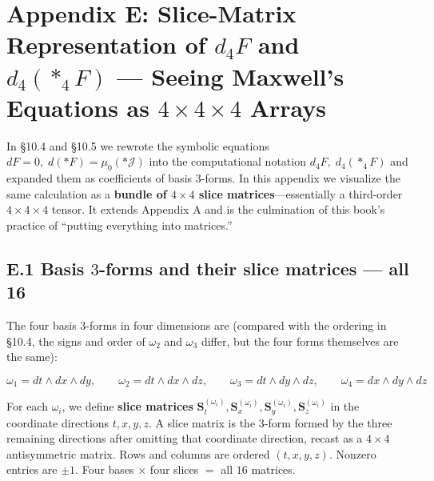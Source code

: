 \documentclass[a4paper,12pt,openany]{book}
\begin{document}
\par\vspace{0.35em}\par

\hypertarget{appendix-e-slice-matrix-representation-of-d_4f-and-d_4ast_4f-seeing-maxwells-equations-as-4times4times4-arrays}{%
\section{\texorpdfstring{Appendix E: Slice-Matrix Representation of
\(d_4F\) and \(d_4(\ast_4F)\) — Seeing Maxwell's Equations as
\(4\times4\times4\)
Arrays}{Appendix E: Slice-Matrix Representation of d\_4F and d\_4(\textbackslash ast\_4F) — Seeing Maxwell's Equations as 4\textbackslash times4\textbackslash times4 Arrays}}\label{appendix-e-slice-matrix-representation-of-d_4f-and-d_4ast_4f-seeing-maxwells-equations-as-4times4times4-arrays}}

In §10.4 and §10.5 we rewrote the symbolic equations
\(dF=0,\;d(\ast F)=\mu_0(\ast\mathcal J)\) into the computational
notation \(d_4F,\;d_4(\ast_4F)\) and expanded them as coefficients of
basis \(3\)-forms. In this appendix we visualize the same calculation as
a \textbf{bundle of $4\times4$ slice matrices}—essentially a
third-order \(4\times4\times4\) tensor. It extends Appendix A and is the
culmination of this book's practice of ``putting everything into
matrices.''

\hypertarget{e.1-basis-3-forms-and-their-slice-matrices-all-16}{%
\subsection*{\texorpdfstring{E.1 Basis \(3\)-forms and their slice
matrices — all
16}{E.1 Basis 3-forms and their slice matrices — all 16}}\label{e.1-basis-3-forms-and-their-slice-matrices-all-16}}

The four basis \(3\)-forms in four dimensions are (compared with the
ordering in §10.4, the signs and order of \(\omega_2\) and \(\omega_3\)
differ, but the four forms themselves are the same):

\[
\omega_1 = dt\wedge dx\wedge dy,\qquad
\omega_2 = dt\wedge dx\wedge dz,\qquad
\omega_3 = dt\wedge dy\wedge dz,\qquad
\omega_4 = dx\wedge dy\wedge dz
\]

For each \(\omega_i\), we define \textbf{slice matrices}
\(\mathbf{S}_{t}^{(\omega_i)}, \mathbf{S}_{x}^{(\omega_i)}, \mathbf{S}_{y}^{(\omega_i)}, \mathbf{S}_{z}^{(\omega_i)}\)
in the coordinate directions \(t,x,y,z\). A slice matrix is the
\(3\)-form formed by the three remaining directions after omitting that
coordinate direction, recast as a \(4\times4\) antisymmetric matrix.
Rows and columns are ordered \((t,x,y,z)\). Nonzero entries are
\(\pm1\). Four bases \(\times\) four slices \(=\) all \(16\) matrices.
\end{document}
